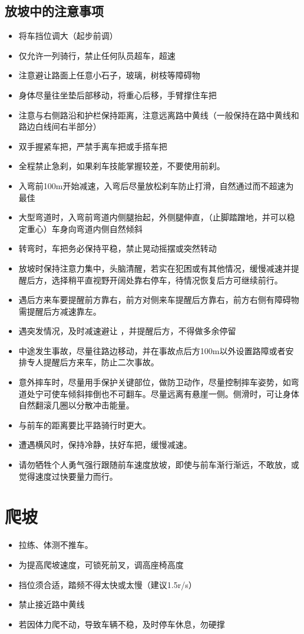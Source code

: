 \documentclass{ctexbook}
\begin{document}
\subsection{放坡中的注意事项}

\begin{itemize}
    \item 将车挡位调大（起步前调）
    \item 仅允许一列骑行，禁止任何队员超车，超速
    \item 注意避让路面上任意小石子，玻璃，树枝等障碍物
    \item 身体尽量往坐垫后部移动，将重心后移，手臂撑住车把
    \item 注意与右侧路沿和护栏保持距离，注意远离路中黄线（一般保持在路中黄线和路边白线间右半部分）
    \item 双手握紧车把，严禁手离车把或手搭车把
    \item 全程禁止急刹，如果刹车技能掌握较差，不要使用前刹。
    \item 入弯前100m开始减速，入弯后尽量放松刹车防止打滑，自然通过而不超速为最佳
    \item 大型弯道时，入弯前弯道内侧腿抬起，外侧腿伸直，（止脚踏蹭地，并可以稳定重心）车身向弯道内侧自然倾斜
    \item 转弯时，车把务必保持平稳，禁止晃动摇摆或突然转动
    \item 放坡时保持注意力集中，头脑清醒，若实在犯困或有其他情况，缓慢减速并提醒后方，选择稍平直视野开阔处靠右停车，待情况恢复后方可继续前行。
    \item 遇后方来车要提醒前方靠右，前方对侧来车提醒后方靠右，前方右侧有障碍物需提醒后方减速靠左。
    \item 遇突发情况，及时减速避让 ，并提醒后方，不得做多余停留   
    \item 中途发生事故，尽量往路边移动，并在事故点后方100m以外设置路障或者安排专人提醒后方来车，防止二次事故。
    \item 意外摔车时，尽量用手保护关键部位，做防卫动作，尽量控制摔车姿势，如弯道处宁可使车倾斜摔倒也不可翻车。尽量远离有悬崖一侧。侧滑时，可让身体自然翻滚几圈以分散冲击能量。
    \item 与前车的距离要比平路骑行时更大。
    \item 遭遇横风时，保持冷静，扶好车把，缓慢减速。
    \item 请勿牺牲个人勇气强行跟随前车速度放坡，即使与前车渐行渐远，不敢放，或觉得速度过快要量力而行。
\end{itemize}
\section{爬坡}
\begin{itemize}
    \item 拉练、体测不推车。

    \item 为提高爬坡速度，可锁死前叉，调高座椅高度
    
    \item 挡位须合适，踏频不得太快或太慢（建议1.5r/s）

    \item 禁止接近路中黄线

    \item 若因体力爬不动，导致车辆不稳，及时停车休息，勿硬撑
\end{itemize}
\end{document}
